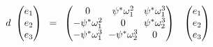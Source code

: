 \documentclass[10pt]{article}
\begin{document}
            \begin{equation*}
                \begin{aligned}
                    d
                    \begin{array}{lc}
                        \setlength{\arraycolsep}{3pt}
                        \begingroup
                        \renewcommand*{\arraystretch}{1}
                        \begin{pmatrix}
                            e_1 \\
                            e_2 \\
                            e_3 \\
                        \end{pmatrix}
                        \endgroup
                    \end{array} = 
                    \begin{array}{lc}
                        \setlength{\arraycolsep}{3pt}
                        \begingroup
                        \renewcommand*{\arraystretch}{1}
                        \begin{pmatrix}
                            0 & \psi^*\omega_1^2 & \psi^*\omega_1^3 \\
                            -\psi^*\omega_1^2 & 0 & \psi^*\omega_2^3 \\
                            -\psi^*\omega_1^3 & -\psi^*\omega_2^3 & 0 \\
                        \end{pmatrix}
                        \endgroup
                    \end{array}
                    \begin{array}{lc}
                        \setlength{\arraycolsep}{3pt}
                        \begingroup
                        \renewcommand*{\arraystretch}{1}
                        \begin{pmatrix}
                            e_1 \\
                            e_2 \\
                            e_3 \\
                        \end{pmatrix}
                        \endgroup
                    \end{array}
                \end{aligned}
            \end{equation*}
\end{document}
